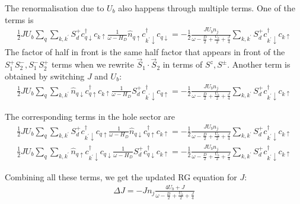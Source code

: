\documentclass[reprint,superscriptaddress,floatfix]{revtex4-2}
\begin{document}
\begin{widetext}
The renormalisation due to \(U_b\) also happens through multiple terms. One of the terms is
\begin{equation}\begin{aligned}
	\frac{1}{2} J U_b \sum_{q} \sum_{k,k^\prime} S_d^+ c^\dagger_{q \downarrow} c_{k \uparrow} \frac{1}{\omega - H_D} \hat n_{q \uparrow} c^\dagger_{k^\prime \downarrow}c_{q \downarrow} = -\frac{1}{2}\frac{J U_b n_j}{\omega - \frac{D}{2} + \frac{U_b}{2} + \frac{J}{4}} \sum_{k,k^\prime} S_d^+ c^\dagger_{k^\prime \downarrow} c_{k \uparrow}
\end{aligned}\end{equation}
The factor of half in front is the same half factor that appears in front of the \(S_1^+ S_2^-, S_1^-S_2^+\) terms when we rewrite \(\vec{S}_1\cdot\vec{S}_2\) in terms of \(S^z, S^\pm\). Another term is obtained by switching \(J\) and \(U_b\):
\begin{equation}\begin{aligned}
	\frac{1}{2} J U_b \sum_{q} \sum_{k,k^\prime} \hat n_{q \downarrow} c^\dagger_{q \uparrow} c_{k \uparrow} \frac{1}{\omega - H_D}S_d^+ c^\dagger_{k^\prime \downarrow} c_{q \uparrow} = -\frac{1}{2}\frac{J U_b n_j}{\omega - \frac{D}{2} + \frac{U_b}{2} + \frac{J}{4}} \sum_{k,k^\prime} S_d^+ c^\dagger_{k^\prime \downarrow} c_{k \uparrow}
\end{aligned}\end{equation}

The corresponding terms in the hole sector are
\begin{equation}\begin{aligned}
	\frac{1}{2} J U_b \sum_{q} \sum_{k,k^\prime} S_d^+ c^\dagger_{k^\prime \downarrow} c_{q \uparrow} \frac{1}{\omega - H_D} \hat n_{q \downarrow} c^\dagger_{q \uparrow}c_{k \uparrow} = -\frac{1}{2}\frac{J U_b n_j}{\omega - \frac{D}{2} + \frac{U_b}{2} + \frac{J}{4}} \sum_{k,k^\prime} S_d^+ c^\dagger_{k^\prime \downarrow} c_{k \uparrow}
\end{aligned}\end{equation}
\begin{equation}\begin{aligned}
	\frac{1}{2} J U_b \sum_{q} \sum_{k,k^\prime} \hat n_{q \uparrow} c^\dagger_{k^\prime \downarrow} c_{q \downarrow} \frac{1}{\omega - H_D}S_d^+ c^\dagger_{q \downarrow} c_{k \uparrow} = -\frac{1}{2}\frac{J U_b n_j}{\omega - \frac{D}{2} + \frac{U_b}{2} + \frac{J}{4}} \sum_{k,k^\prime} S_d^+ c^\dagger_{k^\prime \downarrow} c_{k \uparrow}
\end{aligned}\end{equation}

Combining all these terms, we get the updated RG equation for \(J\):
\begin{equation}\begin{aligned}
	\Delta J = -J n_j\frac{4 U_b + J}{\omega - \frac{D}{2} + \frac{U_b}{2} + \frac{J}{4}}
\end{aligned}\end{equation}

\end{widetext}
\end{document}
